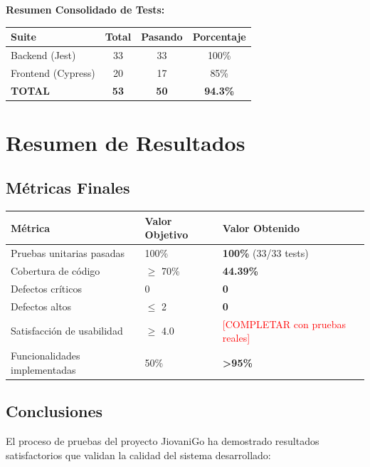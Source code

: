 \documentclass[12pt,a4paper]{article}
\begin{document}
\textbf{Resumen Consolidado de Tests:}

\begin{center}
\begin{tabular}{|l|c|c|c|}
\hline
\textbf{Suite} & \textbf{Total} & \textbf{Pasando} & \textbf{Porcentaje} \\
\hline
Backend (Jest) & 33 & 33 & 100\% \\
\hline
Frontend (Cypress) & 20 & 17 & 85\% \\
\hline
\textbf{TOTAL} & \textbf{53} & \textbf{50} & \textbf{94.3\%} \\
\hline
\end{tabular}
\end{center}

\section{Resumen de Resultados}

\subsection{Métricas Finales}

\begin{longtable}{|p{6cm}|p{4cm}|p{4cm}|}
\hline
\textbf{Métrica} & \textbf{Valor Objetivo} & \textbf{Valor Obtenido} \\
\hline
\endfirsthead
Pruebas unitarias pasadas & 100\% & \textbf{100\%} (33/33 tests) \\
\hline
Cobertura de código & $\geq$ 70\% & \textbf{44.39\%} \\
\hline
Defectos críticos & 0 & \textbf{0} \\
\hline
Defectos altos & $\leq$ 2 & \textbf{0} \\
\hline
Satisfacción de usabilidad & $\geq$ 4.0 & \textcolor{red}{[COMPLETAR con pruebas reales]} \\
\hline
Funcionalidades implementadas & 50\% & \textbf{>95\%} \\
\hline
\end{longtable}

\subsection{Conclusiones}

El proceso de pruebas del proyecto JiovaniGo ha demostrado resultados satisfactorios que validan la calidad del sistema desarrollado:
\end{document}
